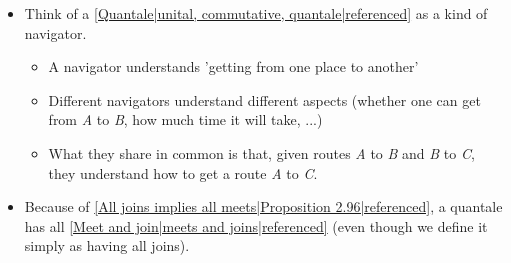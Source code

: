 \begin{itemize}
    \item Think of a \ref{Quantale|unital, commutative, quantale|referenced} as a kind of navigator.
          \begin{itemize}
            \item A navigator understands 'getting from one place to another'
            \item Different navigators understand different aspects (whether one can get from \emph{A} to \emph{B}, how much time it will take, ...)
            \item What they share in common is that, given routes \emph{A} to \emph{B} and \emph{B} to \emph{C}, they understand how to get a route \emph{A} to \emph{C}.
          \end{itemize}
    \item Because of \ref{All joins implies all meets|Proposition 2.96|referenced}, a quantale has all \ref{Meet and join|meets and joins|referenced} (even though we define it simply as having all joins).
  \end{itemize}
